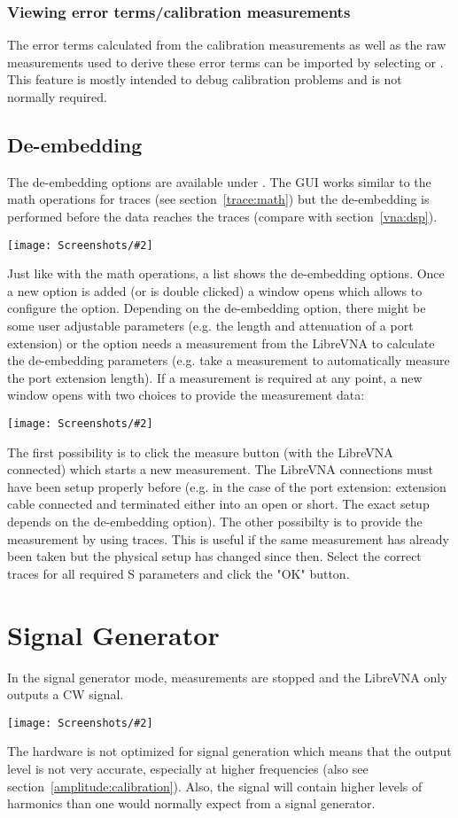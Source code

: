 \documentclass[a4paper,11pt]{article}
\newcommand{\vna}{LibreVNA}
\newcommand{\screenshot}[2]{\begin{center}
\texttt{[image: Screenshots/\#2]}
\end{center}}
\begin{document}
\subsubsection{Viewing error terms/calibration measurements}
The error terms calculated from the calibration measurements as well as the raw measurements used to derive these error terms can be imported by selecting  or . This feature is mostly intended to debug calibration problems and is not normally required.

\subsection{De-embedding}
The de-embedding options are available under . The GUI works similar to the math operations for traces (see section~\ref{trace:math}) but the de-embedding is performed before the data reaches the traces (compare with section~\ref{vna:dsp}).
\screenshot{0.8}{Deembedding.png}

Just like with the math operations, a list shows the de-embedding options. Once a new option is added (or is double clicked) a window opens which allows to configure the option. Depending on the de-embedding option, there might be some user adjustable parameters (e.g. the length and attenuation of a port extension) or the option needs a measurement from the \vna{} to calculate the de-embedding parameters (e.g. take a measurement to automatically measure the port extension length). If a measurement is required at any point, a new window opens with two choices to provide the measurement data:
\screenshot{0.9}{DeembeddingMeas.png}
The first possibility is to click the measure button (with the \vna{} connected) which starts a new measurement. The \vna{} connections must have been setup properly before (e.g. in the case of the port extension: extension cable connected and terminated either into an open or short. The exact setup depends on the de-embedding option). The other possibilty is to provide the measurement by using traces. This is useful if the same measurement has already been taken but the physical setup has changed since then. Select the correct traces for all required S parameters and click the "OK" button.

\section{Signal Generator}
In the signal generator mode, measurements are stopped and the \vna{} only outputs a CW signal.
\screenshot{0.8}{Signalgenerator.png}
The hardware is not optimized for signal generation which means that the output level is not very accurate, especially at higher frequencies (also see section~\ref{amplitude:calibration}). Also, the signal will contain higher levels of harmonics than one would normally expect from a signal generator.
\end{document}
